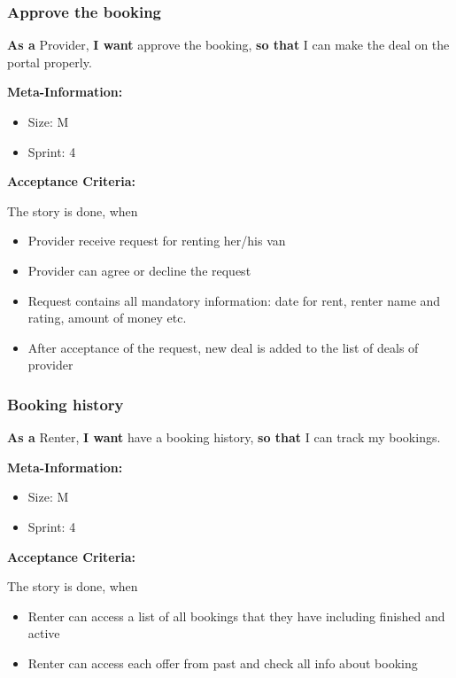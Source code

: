 \subsubsection{Approve the booking}

\textbf{As a} Provider,\hfill\break
\textbf{I want} approve the booking,\hfill\break
\textbf{so that} I can make the deal on the portal properly.

\textbf{Meta-Information:}
\begin{itemize}
    \item Size: M
    \item Sprint: 4
\end{itemize}

\textbf{Acceptance Criteria:}

The story is done, when
\begin{itemize}
    \item Provider receive request for renting her/his van
    \item Provider can agree or decline the request
    \item Request contains all mandatory information: date for rent, renter name and rating, amount of money etc.
    \item After acceptance of the request, new deal is added to the list of deals of provider
\end{itemize}


\subsubsection{Booking history}

\textbf{As a} Renter,\hfill\break
\textbf{I want} have a booking history,\hfill\break
\textbf{so that} I can track my bookings.

\textbf{Meta-Information:}
\begin{itemize}
    \item Size: M
    \item Sprint: 4
\end{itemize}

\textbf{Acceptance Criteria:}

The story is done, when
\begin{itemize}
    \item Renter can access a list of all bookings that they have including finished and active
    \item Renter can access each offer from past and check all info about booking
\end{itemize}


